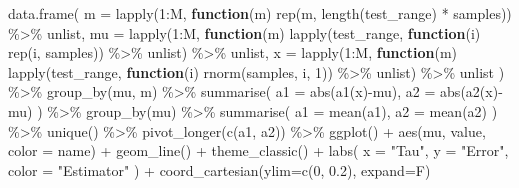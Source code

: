 \documentclass[
]{article}
\newenvironment{Shaded}{\begin{snugshade}}{\end{snugshade}}
\newcommand{\AttributeTok}[1]{\textcolor[rgb]{0.77,0.63,0.00}{#1}}
\newcommand{\ControlFlowTok}[1]{\textcolor[rgb]{0.13,0.29,0.53}{\textbf{#1}}}
\newcommand{\DecValTok}[1]{\textcolor[rgb]{0.00,0.00,0.81}{#1}}
\newcommand{\FloatTok}[1]{\textcolor[rgb]{0.00,0.00,0.81}{#1}}
\newcommand{\FunctionTok}[1]{\textcolor[rgb]{0.00,0.00,0.00}{#1}}
\newcommand{\NormalTok}[1]{#1}
\newcommand{\SpecialCharTok}[1]{\textcolor[rgb]{0.00,0.00,0.00}{#1}}
\newcommand{\StringTok}[1]{\textcolor[rgb]{0.31,0.60,0.02}{#1}}
\begin{document}
\begin{Shaded}
\begin{Highlighting}[]
\FunctionTok{data.frame}\NormalTok{(}
    \AttributeTok{m =} \FunctionTok{lapply}\NormalTok{(}\DecValTok{1}\SpecialCharTok{:}\NormalTok{M, }\ControlFlowTok{function}\NormalTok{(m) }\FunctionTok{rep}\NormalTok{(m, }\FunctionTok{length}\NormalTok{(test\_range) }\SpecialCharTok{*}\NormalTok{ samples)) }\SpecialCharTok{\%\textgreater{}\%}\NormalTok{ unlist,}
    \AttributeTok{mu =} \FunctionTok{lapply}\NormalTok{(}\DecValTok{1}\SpecialCharTok{:}\NormalTok{M, }\ControlFlowTok{function}\NormalTok{(m) }\FunctionTok{lapply}\NormalTok{(test\_range, }\ControlFlowTok{function}\NormalTok{(i) }\FunctionTok{rep}\NormalTok{(i, samples)) }\SpecialCharTok{\%\textgreater{}\%}\NormalTok{ unlist) }\SpecialCharTok{\%\textgreater{}\%}\NormalTok{ unlist,}
    \AttributeTok{x =} \FunctionTok{lapply}\NormalTok{(}\DecValTok{1}\SpecialCharTok{:}\NormalTok{M, }\ControlFlowTok{function}\NormalTok{(m) }\FunctionTok{lapply}\NormalTok{(test\_range, }\ControlFlowTok{function}\NormalTok{(i) }\FunctionTok{rnorm}\NormalTok{(samples, i, }\DecValTok{1}\NormalTok{)) }\SpecialCharTok{\%\textgreater{}\%}\NormalTok{ unlist) }\SpecialCharTok{\%\textgreater{}\%}\NormalTok{ unlist}
\NormalTok{  ) }\SpecialCharTok{\%\textgreater{}\%} 
  \FunctionTok{group\_by}\NormalTok{(mu, m) }\SpecialCharTok{\%\textgreater{}\%} 
  \FunctionTok{summarise}\NormalTok{(}
    \AttributeTok{a1 =} \FunctionTok{abs}\NormalTok{(}\FunctionTok{a1}\NormalTok{(x)}\SpecialCharTok{{-}}\NormalTok{mu),}
    \AttributeTok{a2 =} \FunctionTok{abs}\NormalTok{(}\FunctionTok{a2}\NormalTok{(x)}\SpecialCharTok{{-}}\NormalTok{mu)}
\NormalTok{  ) }\SpecialCharTok{\%\textgreater{}\%} 
  \FunctionTok{group\_by}\NormalTok{(mu) }\SpecialCharTok{\%\textgreater{}\%} 
  \FunctionTok{summarise}\NormalTok{(}
    \AttributeTok{a1 =} \FunctionTok{mean}\NormalTok{(a1),}
    \AttributeTok{a2 =} \FunctionTok{mean}\NormalTok{(a2)}
\NormalTok{  ) }\SpecialCharTok{\%\textgreater{}\%} 
  \FunctionTok{unique}\NormalTok{() }\SpecialCharTok{\%\textgreater{}\%} 
  \FunctionTok{pivot\_longer}\NormalTok{(}\FunctionTok{c}\NormalTok{(a1, a2)) }\SpecialCharTok{\%\textgreater{}\%} 
  \FunctionTok{ggplot}\NormalTok{() }\SpecialCharTok{+}
  \FunctionTok{aes}\NormalTok{(mu, value, }\AttributeTok{color =}\NormalTok{ name) }\SpecialCharTok{+}
  \FunctionTok{geom\_line}\NormalTok{() }\SpecialCharTok{+}
  \FunctionTok{theme\_classic}\NormalTok{() }\SpecialCharTok{+}
  \FunctionTok{labs}\NormalTok{(}
    \AttributeTok{x =} \StringTok{"Tau"}\NormalTok{,}
    \AttributeTok{y =} \StringTok{"Error"}\NormalTok{,}
    \AttributeTok{color =} \StringTok{"Estimator"}
\NormalTok{  ) }\SpecialCharTok{+}
  \FunctionTok{coord\_cartesian}\NormalTok{(}\AttributeTok{ylim=}\FunctionTok{c}\NormalTok{(}\DecValTok{0}\NormalTok{, }\FloatTok{0.2}\NormalTok{), }\AttributeTok{expand=}\NormalTok{F)}
\end{Highlighting}
\end{Shaded}
\end{document}
